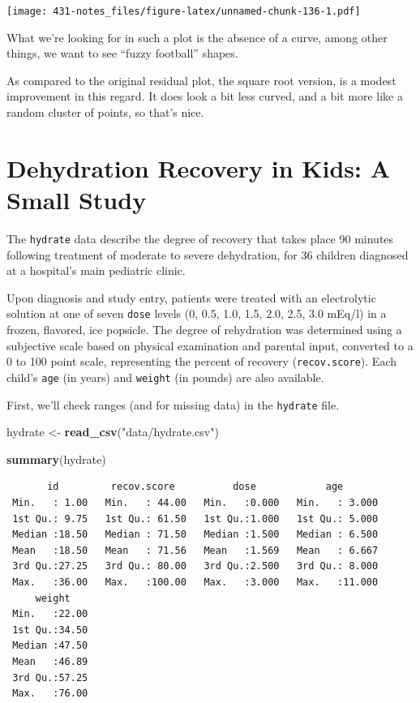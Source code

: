 \documentclass[
]{book}
\newenvironment{Shaded}{\begin{snugshade}}{\end{snugshade}}
\newcommand{\KeywordTok}[1]{\textcolor[rgb]{0.13,0.29,0.53}{\textbf{#1}}}
\newcommand{\NormalTok}[1]{#1}
\newcommand{\StringTok}[1]{\textcolor[rgb]{0.31,0.60,0.02}{#1}}
\begin{document}
\texttt{[image: 431-notes\_files/figure-latex/unnamed-chunk-136-1.pdf]}

What we're looking for in such a plot is the absence of a curve, among other things, we want to see ``fuzzy football'' shapes.

As compared to the original residual plot, the square root version, is a modest improvement in this regard. It does look a bit less curved, and a bit more like a random cluster of points, so that's nice.

\hypertarget{dehydration-recovery-in-kids-a-small-study}{%
\chapter{Dehydration Recovery in Kids: A Small Study}\label{dehydration-recovery-in-kids-a-small-study}}

The \texttt{hydrate} data describe the degree of recovery that takes place 90 minutes following treatment of moderate to severe dehydration, for 36 children diagnosed at a hospital's main pediatric clinic.

Upon diagnosis and study entry, patients were treated with an electrolytic solution at one of seven \texttt{dose} levels (0, 0.5, 1.0, 1.5, 2.0, 2.5, 3.0 mEq/l) in a frozen, flavored, ice popsicle. The degree of rehydration was determined using a subjective scale based on physical examination and parental input, converted to a 0 to 100 point scale, representing the percent of recovery (\texttt{recov.score}). Each child's \texttt{age} (in years) and \texttt{weight} (in pounds) are also available.

First, we'll check ranges (and for missing data) in the \texttt{hydrate} file.

\begin{Shaded}
\begin{Highlighting}[]
\NormalTok{hydrate <-}\StringTok{ }\KeywordTok{read_csv}\NormalTok{(}\StringTok{"data/hydrate.csv"}\NormalTok{)}

\KeywordTok{summary}\NormalTok{(hydrate)}
\end{Highlighting}
\end{Shaded}

\begin{verbatim}
       id         recov.score          dose            age        
 Min.   : 1.00   Min.   : 44.00   Min.   :0.000   Min.   : 3.000  
 1st Qu.: 9.75   1st Qu.: 61.50   1st Qu.:1.000   1st Qu.: 5.000  
 Median :18.50   Median : 71.50   Median :1.500   Median : 6.500  
 Mean   :18.50   Mean   : 71.56   Mean   :1.569   Mean   : 6.667  
 3rd Qu.:27.25   3rd Qu.: 80.00   3rd Qu.:2.500   3rd Qu.: 8.000  
 Max.   :36.00   Max.   :100.00   Max.   :3.000   Max.   :11.000  
     weight     
 Min.   :22.00  
 1st Qu.:34.50  
 Median :47.50  
 Mean   :46.89  
 3rd Qu.:57.25  
 Max.   :76.00  
\end{verbatim}
\end{document}

